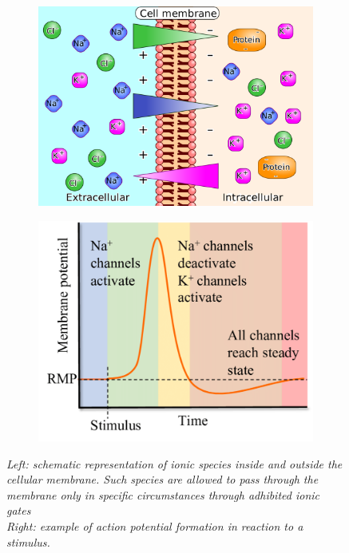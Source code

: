 \documentclass[12pt, a4paper]{article}
\begin{document}
\begin{figure}[H]
	\begin{minipage}{\linewidth}
		\centering
		\begin{minipage}{0.45\linewidth}
			\begin{figure}[H]
				\includegraphics[width=\linewidth]{AP1.png}
				
			\end{figure}
		\end{minipage}
		\hspace{0.05\linewidth}
		\begin{minipage}{0.45\linewidth}
			\begin{figure}[H]
				\includegraphics[width=\linewidth]{AP2.png}
				
			\end{figure}
		\end{minipage}
		
	\end{minipage}
\caption{\textit{Left: schematic representation of ionic species inside and outside the cellular membrane. Such species are allowed to pass through the membrane only in specific circumstances through adhibited ionic gates \\
Right: example of action potential formation in reaction to a stimulus.}}\label{membrane}
\end{figure}
\end{document}

